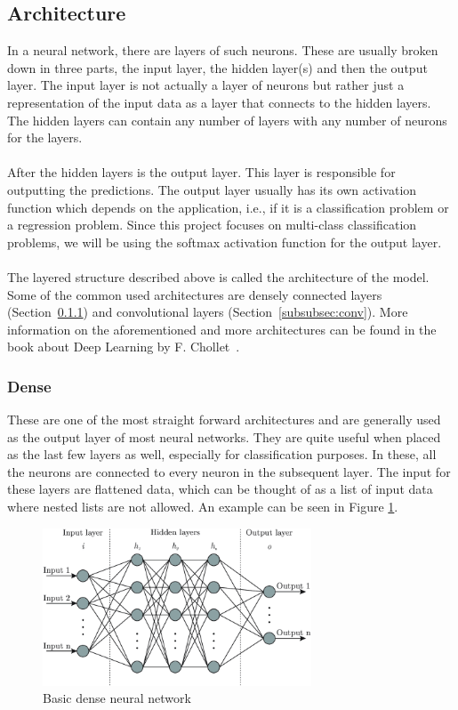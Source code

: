 \documentclass[12pt]{article}
\begin{document}
\subsection{Architecture}
In a neural network, there are layers of such neurons. These are usually broken down in three parts, the input layer, the hidden layer(s) and then the output layer. The input layer is not actually a layer of neurons but rather just a representation of the input data as a layer that connects to the hidden layers. The hidden layers can contain any number of layers with any number of neurons for the layers.
\\\\
After the hidden layers is the output layer. This layer is responsible for outputting the predictions. The output layer usually has its own activation function which depends on the application, i.e., if it is a classification problem or a regression problem. Since this project focuses on multi-class classification problems, we will be using the softmax activation function for the output layer. 
\\\\
The layered structure described above is called the architecture of the model. Some of the common used architectures are densely connected layers (Section~\ref{subsubsec:dense}) and convolutional layers (Section~\ref{subsubsec:conv}). More information on the aforementioned and more architectures can be found in the book about Deep Learning by F. Chollet~\cite{deeplearning}.
\subsubsection{Dense}\label{subsubsec:dense}
These are one of the most straight forward architectures and are generally used as the output layer of most neural networks. They are quite useful when placed as the last few layers as well, especially for classification purposes. In these, all the neurons are connected to every neuron in the subsequent layer. The input for these layers are flattened data, which can be thought of as a list of input data where nested lists are not allowed. An example can be seen in Figure \ref{fig:densenet}. 
\begin{figure}[H]
	\centering
	\includegraphics[width=8cm]{resources/densenet.png}
	\caption{Basic dense neural network~\cite{bre2018prediction}}
	\label{fig:densenet}
\end{figure}
\end{document}
